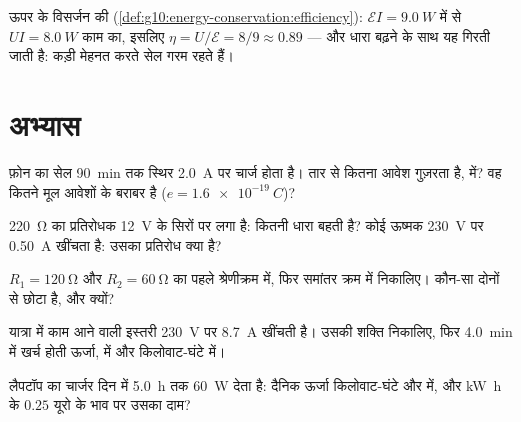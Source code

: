 \begin{example}[सेल की दक्षता]\label{ex:g11:circuits-and-power:efficiency}
ऊपर के विसर्जन की  (\cref{def:g10:energy-conservation:efficiency}): $\mathcal{E}I =
\qty{9.0}{W}$ में से $UI = \qty{8.0}{W}$ काम का,
इसलिए $\eta = U/\mathcal{E} = 8/9 \approx 0.89$ --- और धारा बढ़ने के साथ यह गिरती जाती है: कड़ी मेहनत करते सेल
गरम रहते हैं।
\end{example}

\section{अभ्यास}

\begin{exercise}[$\star$]\label{exo:g11:circuits-and-power:1}
फ़ोन का सेल \qty{90}{min} तक स्थिर \qty{2.0}{A} पर चार्ज होता है। तार से कितना आवेश
गुज़रता है,  में? वह कितने मूल आवेशों के बराबर है ($e = \qty{1.6e-19}{C}$)?
\end{exercise}

\begin{exercise}[$\star$]\label{exo:g11:circuits-and-power:2}
\qty{220}{\ohm} का प्रतिरोधक \qty{12}{V} के सिरों पर लगा है: कितनी धारा बहती है? कोई ऊष्मक
\qty{230}{V} पर \qty{0.50}{A} खींचता है: उसका प्रतिरोध क्या है?
\end{exercise}

\begin{exercise}[$\star$]\label{exo:g11:circuits-and-power:3}
$R_1 = \qty{120}{\ohm}$ और $R_2 =
\qty{60}{\ohm}$ का  पहले श्रेणीक्रम में, फिर
समांतर क्रम में निकालिए। कौन-सा दोनों से छोटा है, और क्यों?
\end{exercise}

\begin{exercise}[$\star$]\label{exo:g11:circuits-and-power:4}
यात्रा में काम आने वाली इस्तरी \qty{230}{V} पर \qty{8.7}{A} खींचती है। उसकी
शक्ति निकालिए, फिर \qty{4.0}{min} में खर्च होती ऊर्जा,
 में और किलोवाट-घंटे में।
\end{exercise}

\begin{exercise}[$\star$]\label{exo:g11:circuits-and-power:5}
लैपटॉप का चार्जर दिन में \qty{5.0}{h} तक \qty{60}{W} देता है: दैनिक ऊर्जा
किलोवाट-घंटे और  में, और \unit{kW.h} के $0.25$ यूरो के भाव
पर उसका दाम?
\end{exercise}

